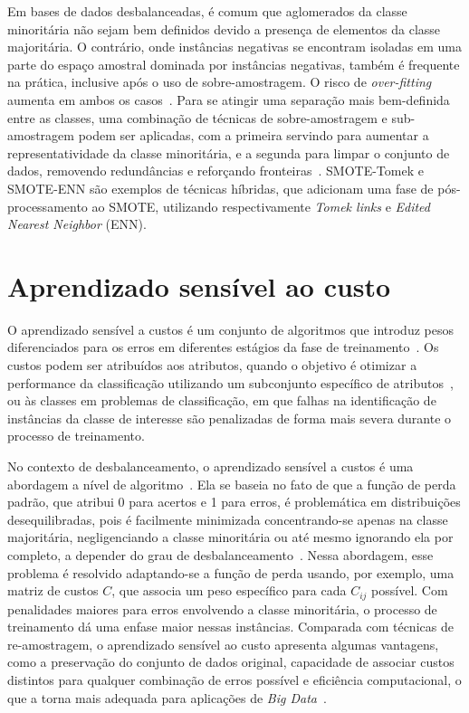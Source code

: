 Em bases de dados desbalanceadas, é comum que aglomerados da classe minoritária não sejam bem definidos devido a presença de elementos da classe majoritária. O contrário, onde instâncias negativas se encontram isoladas em uma parte do espaço amostral dominada por instâncias negativas, também é frequente na prática, inclusive após o uso de sobre-amostragem. O risco de \textit{over-fitting} aumenta em ambos os casos~\cite{Batista2004}. Para se atingir uma separação mais bem-definida entre as classes, uma combinação de técnicas de sobre-amostragem e sub-amostragem podem ser aplicadas, com a primeira servindo para aumentar a representatividade da classe minoritária, e a segunda para limpar o conjunto de dados, removendo redundâncias e reforçando fronteiras~\cite{Pereira2020}. SMOTE-Tomek e SMOTE-ENN são exemplos de técnicas híbridas, que adicionam uma fase de pós-processamento ao SMOTE, utilizando respectivamente \textit{Tomek links} e \textit{Edited Nearest Neighbor} (ENN).

\section{Aprendizado sensível ao custo}

O aprendizado sensível a custos é um conjunto de algoritmos que introduz pesos diferenciados para os erros em diferentes estágios da fase de treinamento~\cite{FernndezCs2018}. Os custos podem ser atribuídos aos atributos, quando o objetivo é otimizar a performance da classificação utilizando um subconjunto específico de atributos~\cite{Zhou2016}, ou às classes em problemas de classificação, em que falhas na identificação de instâncias da classe de interesse são penalizadas de forma mais severa durante o processo de treinamento.

No contexto de desbalanceamento, o aprendizado sensível a custos é uma abordagem a nível de algoritmo~\cite{Krawczyk2016}. Ela se baseia no fato de que a função de perda padrão, que atribui 0 para acertos e 1 para erros, é problemática em distribuições desequilibradas, pois é facilmente minimizada concentrando-se apenas na classe majoritária, negligenciando a classe minoritária ou até mesmo ignorando ela por completo, a depender do grau de desbalanceamento~\cite{Landgrebe2004}. Nessa abordagem, esse problema é resolvido adaptando-se a função de perda usando, por exemplo, uma matriz de custos \(C\), que associa um peso específico para cada \(C_{ij}\) possível. Com penalidades maiores para erros envolvendo a classe minoritária, o processo de treinamento dá uma enfase maior nessas instâncias. Comparada com técnicas de re-amostragem, o aprendizado sensível ao custo apresenta algumas vantagens, como a preservação do conjunto de dados original, capacidade de associar custos distintos para qualquer combinação de erros possível e eficiência computacional, o que a torna mais adequada para aplicações de \textit{Big Data}~\cite{Haixiang2017}.

